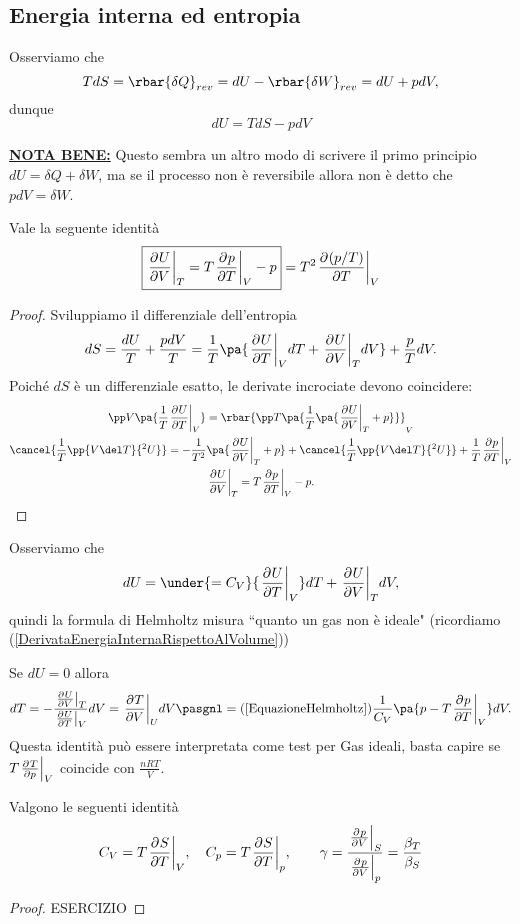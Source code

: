 \subsection{Energia interna ed entropia}

\begin{remark}[Differenziali]
Osserviamo che
\[TdS=\rbar{\delta Q}_{rev}=dU-\rbar{\delta W}_{rev}=dU+pdV,\]
dunque
\[\boxed{dU=TdS-pdV}\]
\end{remark}
\begin{remark}
\underline{\textbf{NOTA BENE:}} Questo sembra un altro modo di scrivere il primo principio $dU=\delta Q+\delta W$, ma se il processo non \`e reversibile allora non \`e detto che $pdV=\delta W$.
\end{remark}

\begin{proposition}\label{EquazioneHelmholtz}
Vale la seguente identit\`a
\[\boxed{\ppb VUT=T\ppb TpV-p}=T^2\ppb T{(p/T)}V\]
\end{proposition}
\begin{proof}
Sviluppiamo il differenziale dell'entropia
\[dS=\frac{dU}T+\frac{pdV}T=\frac1T\pa{\ppb TUVdT+\ppb VUTdV}+\frac pTdV.\]
Poich\'e $dS$ \`e un differenziale esatto, le derivate incrociate devono coincidere:
\begin{gather*}
\pp V{}\pa{\frac1T\ppb TUV}=\rbar{\pp T{}\pa{\frac1T\pa{\ppb VUT+p}}}_V\\
\cancel{\frac1T\pp{V\del T}{^2U}}=-\frac1{T^2}\pa{\ppb VUT+p}+\cancel{\frac1T\pp{V\del T}{^2U}}+\frac1T\ppb TpV\\
\ppb VUT=T\ppb TpV-p.
\end{gather*}
\end{proof}
\begin{remark}
Osserviamo che 
\[dU=\under{=C_V}{\ppb TUV}dT+\ppb VUTdV,\]
quindi la formula di Helmholtz misura ``quanto un gas non \`e ideale" (ricordiamo (\ref{DerivataEnergiaInternaRispettoAlVolume}))
\end{remark}
\begin{remark}
Se $dU=0$ allora
\[dT=-\frac{\ppb VUT}{\ppb TUV}dV=\ppb VTUdV\pasgnl={(\ref{EquazioneHelmholtz})}\frac1{C_V}\pa{p-T\ppb TpV}dV.\]
Questa identit\`a pu\`o essere interpretata come test per Gas ideali, basta capire se $T\ppb pTV$ coincide con $\frac{nRT}V$.
\end{remark}

\begin{remark}
Valgono le seguenti identit\`a
\[C_V=T\ppb TSV,\quad C_p=T\ppb TSp,\qquad \gamma=\frac{\ppb VpS}{\ppb Vpp}=\frac{\beta_T}{\beta_S}\]
\end{remark}
\begin{proof}
ESERCIZIO
\end{proof}





